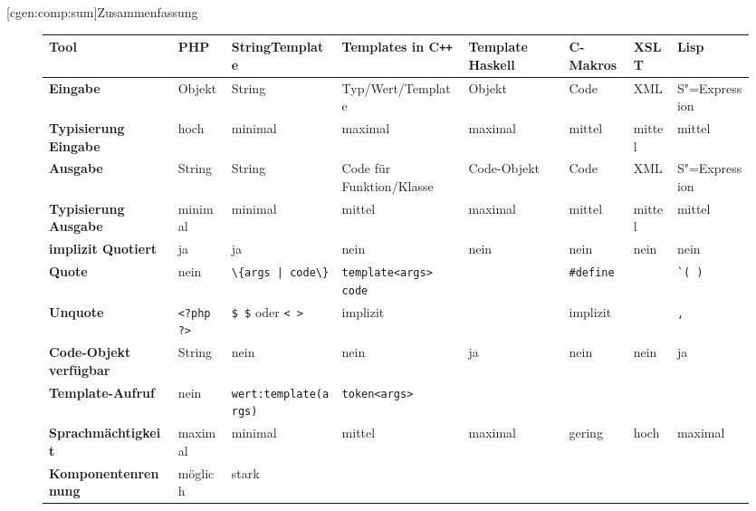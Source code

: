 \documentclass[a4paper, bibgerm]{book}
\newcommand\icode[1]{\lstinline?#1?}
\newcommand\phpo{\lstinline+<?php+}
\newcommand\phpc{\lstinline+?>+}
\newcommand\lsubsection{}
\newcommand{\sexp}{S"=Expression}
\newcommand{\cpp}{C\texttt{++}}
\begin{document}
\lsubsection[cgen:comp:sum]{Zusammenfassung}

\begin{figure}
  \centering
\begin{tabular}{|l|l|l|l|l|l|l|l|} \hline
\bf Tool             &\bf PHP        &\bf StringTemplate          &\bf Templates in \cpp{}    &\bf Template Haskell&\bf C-Makros&\bf XSLT &\bf Lisp         \\\hline\hline
\bf Eingabe              &Objekt         &String                      &Typ/Wert/Template          &Objekt          &Code            &XML      &\sexp{}     \\\hline
\bf Typisierung Eingabe  &hoch           &minimal                     &maximal                    &maximal         &mittel          &mittel   &mittel      \\\hline
\bf Ausgabe              &String         &String                      &Code für Funktion/Klasse   &Code-Objekt     &Code            &XML      &\sexp{}     \\\hline
\bf Typisierung Ausgabe  &minimal        &minimal                     &mittel                     &maximal         &mittel          &mittel   &mittel      \\\hline
\bf implizit Quotiert    &ja             &ja                          &nein                       &nein            &nein            &nein     &nein        \\\hline
\bf Quote                &nein           &\icode{\{args | code\}}     &\icode{template<args> code}&                &\icode{#define} &         &\icode{`( )}\\\hline
\bf Unquote              &\phpo{} \phpc{}&\icode{$ $} oder \icode{< >}&implizit                   &                &implizit        &         &\icode{,}   \\\hline
\bf Code-Objekt verfügbar&String         &nein                        &nein                       &ja              &nein            &nein     &ja          \\\hline
\bf Template-Aufruf      &nein           &\icode{wert:template(args)} &\icode{token<args>}        &                &                &         &            \\\hline  
\bf Sprachmächtigkeit    &maximal        &minimal                     &mittel                     &maximal         &gering          &hoch     &maximal     \\\hline
\bf Komponentenrennung   &möglich        &stark                       &                           &                &                &         &            \\\hline

\end{tabular}
\end{figure}
\end{document}
